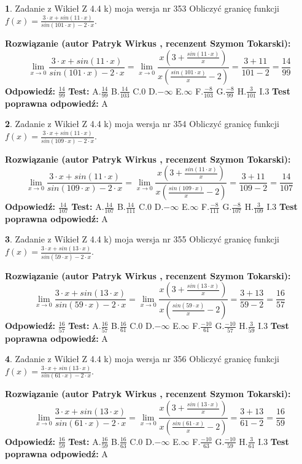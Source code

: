 \documentclass[12pt, a4paper]{article}
\theoremstyle{definition} %
\newtheorem{zad}{}
\newcommand{\zadStart}[1]{\begin{zad}#1\newline}
\newcommand{\zadStop}{\end{zad}}
\newcommand{\rozwStart}[2]{\noindent \textbf{Rozwiązanie (autor #1 , recenzent #2): }\newline}
\newcommand{\rozwStop}{\newline}
\newcommand{\odpStart}{\noindent \textbf{Odpowiedź:}\newline}
\newcommand{\odpStop}{\newline}
\newcommand{\testStart}{\noindent \textbf{Test:}\newline}
\newcommand{\testStop}{\newline}
\newcommand{\kluczStart}{\noindent \textbf{Test poprawna odpowiedź:}\newline}
\newcommand{\kluczStop}{\newline}
\begin{document}
\zadStart{Zadanie z Wikieł Z 4.4 k) moja wersja nr 353}
Obliczyć granicę funkcji $f(x)=\frac{3\cdot x +sin(11\cdot x)}{sin(101\cdot x) -2\cdot x}$.
\zadStop
\rozwStart{Patryk Wirkus}{Szymon Tokarski}
$$\lim\limits_{x\to 0}\frac{3\cdot x +sin(11\cdot x)}{sin(101\cdot x) -2\cdot x}
=\lim\limits_{x\to 0}\frac{x(3+\frac{sin(11\cdot x)}{x})}{x(\frac{sin(101\cdot x)}{x}-2)}
=\frac{3+11}{101-2} = \frac{14}{99}$$
\rozwStop
\odpStart
$\frac{14}{99}$
\odpStop
\testStart
A.$\frac{14}{99}$
B.$\frac{14}{103}$
C.$0$
D.$-\infty$
E.$\infty$
F.$\frac{-8}{103}$
G.$\frac{-8}{99}$
H.$\frac{3}{101}$
I.$3$
\testStop
\kluczStart
A
\kluczStop



\zadStart{Zadanie z Wikieł Z 4.4 k) moja wersja nr 354}
Obliczyć granicę funkcji $f(x)=\frac{3\cdot x +sin(11\cdot x)}{sin(109\cdot x) -2\cdot x}$.
\zadStop
\rozwStart{Patryk Wirkus}{Szymon Tokarski}
$$\lim\limits_{x\to 0}\frac{3\cdot x +sin(11\cdot x)}{sin(109\cdot x) -2\cdot x}
=\lim\limits_{x\to 0}\frac{x(3+\frac{sin(11\cdot x)}{x})}{x(\frac{sin(109\cdot x)}{x}-2)}
=\frac{3+11}{109-2} = \frac{14}{107}$$
\rozwStop
\odpStart
$\frac{14}{107}$
\odpStop
\testStart
A.$\frac{14}{107}$
B.$\frac{14}{111}$
C.$0$
D.$-\infty$
E.$\infty$
F.$\frac{-8}{111}$
G.$\frac{-8}{107}$
H.$\frac{3}{109}$
I.$3$
\testStop
\kluczStart
A
\kluczStop



\zadStart{Zadanie z Wikieł Z 4.4 k) moja wersja nr 355}
Obliczyć granicę funkcji $f(x)=\frac{3\cdot x +sin(13\cdot x)}{sin(59\cdot x) -2\cdot x}$.
\zadStop
\rozwStart{Patryk Wirkus}{Szymon Tokarski}
$$\lim\limits_{x\to 0}\frac{3\cdot x +sin(13\cdot x)}{sin(59\cdot x) -2\cdot x}
=\lim\limits_{x\to 0}\frac{x(3+\frac{sin(13\cdot x)}{x})}{x(\frac{sin(59\cdot x)}{x}-2)}
=\frac{3+13}{59-2} = \frac{16}{57}$$
\rozwStop
\odpStart
$\frac{16}{57}$
\odpStop
\testStart
A.$\frac{16}{57}$
B.$\frac{16}{61}$
C.$0$
D.$-\infty$
E.$\infty$
F.$\frac{-10}{61}$
G.$\frac{-10}{57}$
H.$\frac{3}{59}$
I.$3$
\testStop
\kluczStart
A
\kluczStop



\zadStart{Zadanie z Wikieł Z 4.4 k) moja wersja nr 356}
Obliczyć granicę funkcji $f(x)=\frac{3\cdot x +sin(13\cdot x)}{sin(61\cdot x) -2\cdot x}$.
\zadStop
\rozwStart{Patryk Wirkus}{Szymon Tokarski}
$$\lim\limits_{x\to 0}\frac{3\cdot x +sin(13\cdot x)}{sin(61\cdot x) -2\cdot x}
=\lim\limits_{x\to 0}\frac{x(3+\frac{sin(13\cdot x)}{x})}{x(\frac{sin(61\cdot x)}{x}-2)}
=\frac{3+13}{61-2} = \frac{16}{59}$$
\rozwStop
\odpStart
$\frac{16}{59}$
\odpStop
\testStart
A.$\frac{16}{59}$
B.$\frac{16}{63}$
C.$0$
D.$-\infty$
E.$\infty$
F.$\frac{-10}{63}$
G.$\frac{-10}{59}$
H.$\frac{3}{61}$
I.$3$
\testStop
\kluczStart
A
\kluczStop
\end{document}
